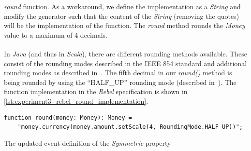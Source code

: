 \textit{round} function. As a workaround, we define the implementation as a
\textit{String} and modify the generator such that the content of the
\textit{String} (removing the quotes) will be the implementation of the
function. The \textit{round} method rounds the \textit{Money} value to a maximum
of 4 decimals.\\
\\
In \textit{Java} (and thus in \textit{Scala}), there are different rounding
methods available. These consist of the rounding modes described in the IEEE 854
standard and additional rounding modes as described
in~\cite{cowlishaw2003decimal}. The fifth decimal in our \textit{round()} method
is being rounded by using the ``HALF\_UP'' rounding mode
(described in~\cite{cowlishaw2003decimal}). The function implementation in the
\textit{Rebel} specification is shown in
\autoref{lst:experiment3_rebel_round_implementation}.
\begin{sourcecode}[!ht]
\begin{lstlisting}[language=Rebel]
function round(money: Money): Money =
    "money.currency(money.amount.setScale(4, RoundingMode.HALF_UP))";
\end{lstlisting}
\caption{The updated event definition of the \textit{Symmetric} property}
\label{lst:experiment3_rebel_round_implementation}
\end{sourcecode}
\FloatBarrier\noindent

